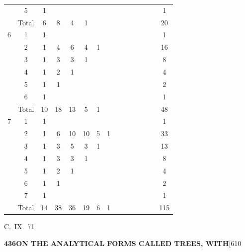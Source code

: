 \documentclass[11pt,a4paper]{book}
\begin{document}
{\begin{center}
\begin{longtable}{|c|c|c|c|c|c|c|c|c|c|c|c|c|c|c|}
  & 5 & 1 & & & & & & & & & & & & 1 \\
  & Total & 6 & 8 & 4 & 1 & & & & & & & & & 20 \\
\hline
6 & 1 & 1 & & & & & & & & & & & & 1 \\
  & 2 & 1 & 4 & 6 & 4 & 1 & & & & & & & & 16 \\
  & 3 & 1 & 3 & 3 & 1 & & & & & & & & & 8 \\
  & 4 & 1 & 2 & 1 & & & & & & & & & & 4 \\
  & 5 & 1 & 1 & & & & & & & & & & & 2 \\
  & 6 & 1 & & & & & & & & & & & & 1 \\
  & Total & 10 & 18 & 13 & 5 & 1 & & & & & & & & 48 \\
\hline
7 & 1 & 1 & & & & & & & & & & & & 1 \\
  & 2 & 1 & 6 & 10 & 10 & 5 & 1 & & & & & & & 33 \\
  & 3 & 1 & 3 & 5 & 3 & 1 & & & & & & & & 13 \\
  & 4 & 1 & 3 & 3 & 1 & & & & & & & & & 8 \\
  & 5 & 1 & 2 & 1 & & & & & & & & & & 4 \\
  & 6 & 1 & 1 & & & & & & & & & & & 2 \\
  & 7 & 1 & & & & & & & & & & & & 1 \\
  & Total & 14 & 38 & 36 & 19 & 6 & 1 & & & & & & & 115 \\
\hline
\end{longtable}
\end{center}
\hfill C.~IX.\ 71

\newpage
\noindent\textbf{436}\hspace{\fill}\textbf{ON THE ANALYTICAL FORMS CALLED TREES, WITH}\hspace{\fill}[610

}
\end{document}
